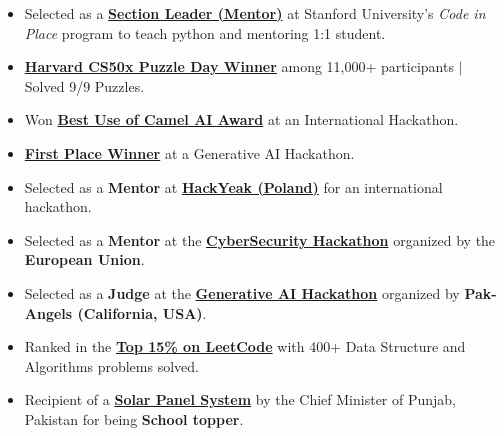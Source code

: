 \documentclass[a4paper,12pt]{article}
\begin{document}
\begin{itemize}[leftmargin=*]
    \item Selected as a \href{https://digitalcredential.stanford.edu/check/FA458483850B4B635DD0915130CCBEBF00F195AFCBF6991EE7448725533BAAB2LzFqZHI1YU9SSmVRZFpMQjVXV0xjdkxuWktYOExkU2RBZE85SFF6YmlPZGZLZDA0}{\textbf{Section Leader (Mentor)}} at Stanford University’s \textit{Code in Place} program to teach python and mentoring 1:1 student.
    \item \href{https://www.linkedin.com/posts/muhammad-qasim-gill_cs50-harvard-puzzleday2025-activity-7316559580790972418-4B6G?utm_source=share&utm_medium=member_desktop&rcm=ACoAACG6gOwBnlfoWP0KSUXYMZV0hE4WXwmWsBQ}{\textbf{Harvard CS50x Puzzle Day Winner}} among 11,000+ participants $|$ Solved 9/9 Puzzles.
    \item Won \href{https://lablab.ai/event/fall-in-love-with-deepseek/shallowseekers/ai-powered-personal-finance-assistant}{\textbf{Best Use of Camel AI Award}} at an International Hackathon.
    \item \href{https://www.linkedin.com/posts/muhammad-qasim-gill_celebrating-the-top-10-hackathon-winners-activity-7304649229472309248--oea?utm_source=share&utm_medium=member_desktop&rcm=ACoAACG6gOwBnlfoWP0KSUXYMZV0hE4WXwmWsBQ}{\textbf{First Place Winner}} at a Generative AI Hackathon.
    \item Selected as a \textbf{Mentor} at \href{https://2025.hackyeah.pl/bio_mentor_2025/#id=60630}{\textbf{HackYeak (Poland)}} for an international hackathon.
    \item Selected as a \textbf{Mentor} at the \href{https://drive.google.com/file/d/1HdK8eSl7OtU3rPIkfh5ytRqUkZE4SsNM/view?usp=sharing}{\textbf{CyberSecurity Hackathon}} organized by the \textbf{European Union}.
    \item Selected as a \textbf{Judge} at the \href{https://www.linkedin.com/company/pakangels/posts/}{\textbf{Generative AI Hackathon}} organized by \textbf{Pak-Angels (California, USA)}.
    \item Ranked in the \href{https://leetcode.com/u/MuhammadQasim007/}{\textbf{Top 15\% on LeetCode}} with 400+ Data Structure and Algorithms problems solved.
    \item Recipient of a \href{https://drive.google.com/file/d/1RJtZZy4bmxIHsum4lScyPMozND_tC72V/view?usp=sharing}{\textbf{Solar Panel System}} by the Chief Minister of Punjab, Pakistan for being \textbf{School topper}.

\end{itemize}
\end{document}
